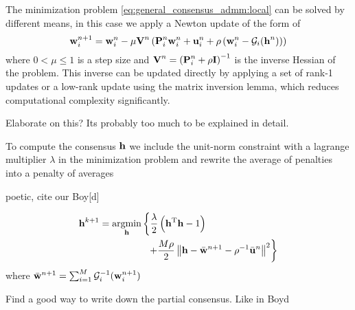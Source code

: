 \documentclass{article}
\newcommand{\h}{\mtxb{h}}
\newcommand{\w}{\mtxb{w}}
\newcommand{\uu}{\mtxb{u}}
\newcommand{\aRho}{\mtxb{P}}
\newcommand{\I}{\mtxb{I}}
\begin{document}
The minimization problem \eqref{eq:general_consensus_admm:local} can be solved by different means, in this case we apply a Newton update of the form of
\begin{equation}
    \w_i^{n+1} = \w_i^{n} - \mu \mtxb{V}^n \left( \aRho_i^n \w_i^n + \uu_i^n + \rho\left(\w_i^n - \mathcal{G}_i(\h^n)\right)\right)
\end{equation}
where \(0  <\mu\leq 1\) is a step size and \(\mtxb{V}^n = \left(\aRho_i^n + \rho \I \right)^{-1}\) is the inverse Hessian of the problem.
This inverse can be updated directly by applying a set of rank-1 updates or a low-rank update using the matrix inversion lemma, which reduces computational complexity significantly.
\begin{attention}
    Elaborate on this? Its probably too much to be explained in detail.
\end{attention}

To compute the consensus \(\h\) we include the unit-norm constraint with a lagrange multiplier \(\lambda\) in the minimization problem and rewrite the average of penalties into a penalty of averages \cite{}
\begin{attention}
    poetic, cite our Boy[d]
\end{attention}
\begin{align}
    \h^{k+1} &= \underset{\h}{\operatorname{argmin}} \left\{ \frac{\lambda}{2} \left(\h^\T \h - 1\right)\right.\nonumber\\
    &\left. \qquad \qquad \quad + \frac{M \rho}{2} \left\| \h - \bar{\w}^{n+1} - \rho^{-1} \bar{\uu}^{n} \right\|^2 \right\}
\end{align}
where \(\bar{\w}^{n+1} = \sum_{i=1}^{M} \mathcal{G}_i^{-1}(\w_i^{n+1})\)
\begin{attention}
    Find a good way to write down the partial consensus. Like in Boyd
\end{attention}


\end{document}
